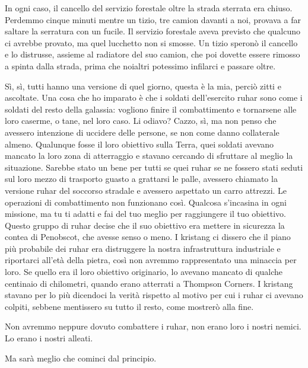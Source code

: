 In ogni caso, il cancello del servizio forestale oltre la strada
sterrata era chiuso. Perdemmo cinque minuti mentre un tizio, tre camion
davanti a noi, provava a far saltare la serratura con un fucile. Il
servizio forestale aveva previsto che qualcuno ci avrebbe provato, ma
quel lucchetto non si smosse. Un tizio speronò il cancello e lo
distrusse, assieme al radiatore del suo camion, che poi dovette essere
rimosso a spinta dalla strada, prima che noialtri potessimo infilarci e
passare oltre.

Sì, sì, tutti hanno una versione di quel giorno, questa è la mia, perciò
zitti e ascoltate. Una cosa che ho imparato è che i soldati
dell'esercito ruhar sono come i soldati del resto della galassia:
vogliono finire il combattimento e tornarsene alle loro caserme, o tane,
nel loro caso. Li odiavo? Cazzo, sì, ma non penso che avessero
intenzione di uccidere delle persone, se non come danno collaterale
almeno. Qualunque fosse il loro obiettivo sulla Terra, quei soldati
avevano mancato la loro zona di atterraggio e stavano cercando di
sfruttare al meglio la situazione. Sarebbe stato un bene per tutti se
quei ruhar se ne fossero stati seduti sul loro mezzo di trasporto guasto
a grattarsi le palle, avessero chiamato la versione ruhar del soccorso
stradale e avessero aspettato un carro attrezzi. Le operazioni di
combattimento non funzionano così. Qualcosa s'incasina in ogni missione,
ma tu ti adatti e fai del tuo meglio per raggiungere il tuo obiettivo.
Questo gruppo di ruhar decise che il suo obiettivo era mettere in
sicurezza la contea di Penobscot, che avesse senso o meno. I kristang ci
dissero che il piano più probabile dei ruhar era distruggere la nostra
infrastruttura industriale e riportarci all'età della pietra, così non
avremmo rappresentato una minaccia per loro. Se quello era il loro
obiettivo originario, lo avevano mancato di qualche centinaio di
chilometri, quando erano atterrati a Thompson Corners. I kristang
stavano per lo più dicendoci la verità rispetto al motivo per cui i
ruhar ci avevano colpiti, sebbene mentissero su tutto il resto, come
mostrerò alla fine.

Non avremmo neppure dovuto combattere i ruhar, non erano loro i nostri
nemici. Lo erano i nostri alleati.

Ma sarà meglio che cominci dal principio.

\hfill\break

